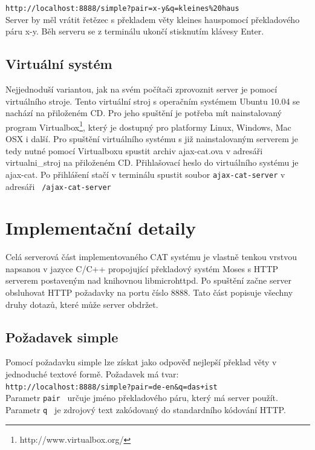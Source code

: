 \documentclass[12pt,a4paper]{report}
\begin{document}
{\tt http://localhost:8888/simple?pair=x-y\&q=kleines\%20haus} \\

Server by měl vrátit řetězec s překladem věty \clqq kleines haus\crqq  pomocí překladového páru \clqq x-y\crqq . Běh serveru se z terminálu ukončí stisknutím klávesy Enter.

\subsection{Virtuální systém}

Nejjednoduší variantou, jak na svém počítači zprovoznit server je pomocí virtuálního stroje. Tento virtuální stroj s operačním systémem Ubuntu 10.04 se nachází na přiloženém CD. Pro jeho spuštění je potřeba mít nainstalovaný program Virtualbox\footnote{http://www.virtualbox.org/}, který je dostupný pro platformy Linux, Windows, Mac OSX i další. Pro spuštění virtuálního systému s již nainstalovaným serverem je tedy nutné pomocí Virtualboxu spustit archiv ajax-cat.ova v adresáři virtualni\_stroj na přiloženém CD. Přihlašovací heslo do virtuálního systému je \clqq ajax-cat\crqq . Po přihlášení stačí v terminálu spustit soubor {\tt ajax-cat-server} v adresáři {\tt ~/ajax-cat-server}


\section{Implementační detaily}

Celá serverová část implementovaného CAT systému je vlastně tenkou vrstvou napsanou v jazyce C/C++ propojující překladový systém Moses s HTTP serverem postaveným nad knihovnou libmicrohttpd. Po spuštění začne server obsluhovat HTTP požadavky na portu číslo 8888. Tato část popisuje všechny druhy dotazů, které může server obdržet.


\subsection{Požadavek simple}
Pomocí požadavku simple lze získat jako odpověď nejlepší překlad věty v jednoduché textové formě. Požadavek má tvar: \\

{\tt http://localhost:8888/simple?pair=de-en\&q=das+ist } \\

Parametr {\tt pair } určuje jméno překladového páru, který má server použít. Parametr {\tt q } je zdrojový text zakódovaný do standardního kódování HTTP.
\end{document}
